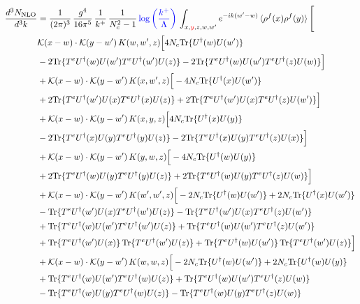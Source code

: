 \documentclass[9pt]{article}
\newcommand{\chg}[1]{{\color{red}#1}}
\numberwithin{equation}{section}
\begin{document}
\begin{align}
    \frac{d^{3}N_{\mathrm{NLO}}}{d^{3}k} & = \frac{1}{(2\pi)^{3}}\,\frac{g^{4}}{16\pi^{5}}\,\frac{1}{k^{+}}\,\frac{1}{N^{2}_{c}-1}\,{\color{blue}\log{\left(\frac{k^{+}}{\Lambda}\right)}}\,\int_{x,\chg{y},z,w,w'}e^{-ik(w'-w)}\,\langle\rho^{f}(x)\rho^{f}(y) \rangle\,\Bigg[\notag \\ & \mathcal K(x-w)\cdot\mathcal K(y-w')\,K(w,w',z)\Big[4 N_{c}{\rm Tr}\{U^\dagger(w)U(w')\}\notag\\
&-2{\rm Tr}\{T^eU^\dagger(w)U(w')T^eU^\dagger(w')U(z)\}-2{\rm Tr}\{T^eU^\dagger(w)U(w')T^eU^\dagger(z)U(w)\}\Big]\notag\\
&+\mathcal K(x-w)\cdot\mathcal K(y-w')\,K(x,w',z)\Big[-4 N_{c}{\rm Tr}\{U^\dagger(x)U(w')\}\notag\\
&+2{\rm Tr}\{T^eU^\dagger(w')U(x)T^eU^\dagger(x)U(z)\}+2{\rm Tr}\{T^eU^\dagger(w')U(x)T^eU^\dagger(z)U(w')\}\Big]\notag\\
&+\mathcal K(x-w)\cdot\mathcal K(y-w')\,K(x,y,z)\Big[4 N_{c}{\rm Tr}\{U^\dagger(x)U(y)\}\notag\\
&-2{\rm Tr}\{T^eU^\dagger(x)U(y)T^eU^\dagger(y)U(z)\}-2{\rm Tr}\{T^eU^\dagger(x)U(y)T^eU^\dagger(z)U(x)\}\Big]\notag\\
&+\mathcal K(x-w)\cdot\mathcal K(y-w')\,K(y,w,z)\Big[-4 N_{c}{\rm Tr}\{U^\dagger(w)U(y)\}\notag\\
&+2{\rm Tr}\{T^eU^\dagger(w)U(y)T^eU^\dagger(y)U(z)\}+2{\rm Tr}\{T^eU^\dagger(w)U(y)T^eU^\dagger(z)U(w)\}\Big]\notag\\
&+\mathcal K(x-w)\cdot\mathcal K(y-w')\,K(w',w',z)\Big[-2 N_{c}{\rm Tr}\{U^\dagger(w)U(w')\}+2 N_{c}{\rm Tr}\{U^\dagger(x)U(w')\}\notag\\
&-{\rm Tr}\{T^eU^\dagger(w')U(x)T^eU^\dagger(w')U(z)\}-{\rm Tr}\{T^eU^\dagger(w')U(x)T^eU^\dagger(z)U(w')\}\notag\\
&+{\rm Tr}\{T^eU^\dagger(w)U(w')T^eU^\dagger(w')U(z)\}+{\rm Tr}\{T^eU^\dagger(w)U(w')T^eU^\dagger(z)U(w')\}\notag\\
&+{\rm Tr}\{T^eU^\dagger(w')U(x)\}\,{\rm Tr}\{T^eU^\dagger(w')U(z)\}+{\rm Tr}\{T^eU^\dagger(w)U(w')\}\,{\rm Tr}\{T^eU^\dagger(w')U(z)\}\Big]\notag\\
&+\mathcal K(x-w)\cdot\mathcal K(y-w')\,K(w,w,z)\Big[-2 N_{c}{\rm Tr}\{U^\dagger(w)U(w')\}+2 N_{c}{\rm Tr}\{U^\dagger(w)U(y)\}\notag\\
&+{\rm Tr}\{T^eU^\dagger(w)U(w')T^eU^\dagger(w)U(z)\}+{\rm Tr}\{T^eU^\dagger(w)U(w')T^eU^\dagger(z)U(w)\}\notag\\
&-{\rm Tr}\{T^eU^\dagger(w)U(y)T^eU^\dagger(w)U(z)\}-{\rm Tr}\{T^eU^\dagger(w)U(y)T^eU^\dagger(z)U(w)\}\notag\\

\end{align}
\end{document}
